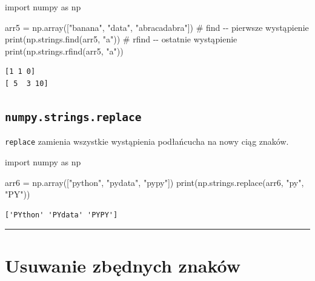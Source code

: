 \documentclass[
  polish,
  letterpaper,
  DIV=11,
  numbers=noendperiod]{scrreprt}
\newenvironment{Shaded}{\begin{snugshade}}{\end{snugshade}}
\newcommand{\BuiltInTok}[1]{\textcolor[rgb]{0.00,0.23,0.31}{#1}}
\newcommand{\CommentTok}[1]{\textcolor[rgb]{0.37,0.37,0.37}{#1}}
\newcommand{\ImportTok}[1]{\textcolor[rgb]{0.00,0.46,0.62}{#1}}
\newcommand{\NormalTok}[1]{\textcolor[rgb]{0.00,0.23,0.31}{#1}}
\newcommand{\OperatorTok}[1]{\textcolor[rgb]{0.37,0.37,0.37}{#1}}
\newcommand{\StringTok}[1]{\textcolor[rgb]{0.13,0.47,0.30}{#1}}
\begin{document}
\begin{Shaded}
\begin{Highlighting}[]
\ImportTok{import}\NormalTok{ numpy }\ImportTok{as}\NormalTok{ np}

\NormalTok{arr5 }\OperatorTok{=}\NormalTok{ np.array([}\StringTok{"banana"}\NormalTok{, }\StringTok{"data"}\NormalTok{, }\StringTok{"abracadabra"}\NormalTok{])}
\CommentTok{\# find {-}{-} pierwsze wystąpienie}
\BuiltInTok{print}\NormalTok{(np.strings.find(arr5, }\StringTok{"a"}\NormalTok{))}
\CommentTok{\# rfind {-}{-} ostatnie wystąpienie}
\BuiltInTok{print}\NormalTok{(np.strings.rfind(arr5, }\StringTok{"a"}\NormalTok{))}
\end{Highlighting}
\end{Shaded}

\begin{verbatim}
[1 1 0]
[ 5  3 10]
\end{verbatim}

\subsection{\texorpdfstring{\texttt{numpy.strings.replace}}{numpy.strings.replace}}\label{numpy.strings.replace}

\texttt{replace} zamienia wszystkie wystąpienia podłańcucha na nowy ciąg
znaków.

\begin{Shaded}
\begin{Highlighting}[]
\ImportTok{import}\NormalTok{ numpy }\ImportTok{as}\NormalTok{ np}

\NormalTok{arr6 }\OperatorTok{=}\NormalTok{ np.array([}\StringTok{"python"}\NormalTok{, }\StringTok{"pydata"}\NormalTok{, }\StringTok{"pypy"}\NormalTok{])}
\BuiltInTok{print}\NormalTok{(np.strings.replace(arr6, }\StringTok{"py"}\NormalTok{, }\StringTok{"PY"}\NormalTok{))}
\end{Highlighting}
\end{Shaded}

\begin{verbatim}
['PYthon' 'PYdata' 'PYPY']
\end{verbatim}

\begin{center}\rule{0.5\linewidth}{0.5pt}\end{center}

\section{Usuwanie zbędnych
znaków}\label{usuwanie-zbux119dnych-znakuxf3w}
\end{document}
